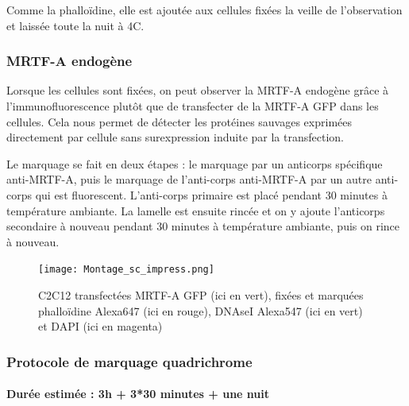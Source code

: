 		Comme la phalloïdine, elle est ajoutée aux cellules fixées la veille de l'observation et laissée toute la nuit à 4\degres   C. 
		\subsubsection{MRTF-A endogène}
		
		Lorsque les cellules sont fixées, on peut observer la MRTF-A endogène grâce à l'immunofluorescence plutôt que de transfecter de la MRTF-A GFP dans les cellules. Cela nous permet de détecter les protéines sauvages exprimées directement par cellule sans surexpression induite par la transfection. 
		
		Le marquage se fait en deux étapes : le marquage par un anticorps spécifique anti-MRTF-A, puis le marquage de l'anti-corps anti-MRTF-A par un autre anti-corps qui est fluorescent. L'anti-corps primaire est placé pendant 30 minutes à température ambiante. La lamelle est ensuite rincée et on y ajoute l'anticorps secondaire à nouveau pendant 30 minutes à température ambiante, puis on rince à nouveau. 
		 
				
		\begin{figure}
		\texttt{[image: Montage\_sc\_impress.png]}
		\caption{C2C12 transfectées MRTF-A GFP (ici en vert), fixées et marquées phalloïdine Alexa647 (ici en rouge), DNAseI Alexa547 (ici en vert) et DAPI (ici en magenta)}
		\end{figure}

\subsubsection{Protocole de marquage quadrichrome}
\paragraph{Durée estimée : 3h + 3*30 minutes + une nuit }
